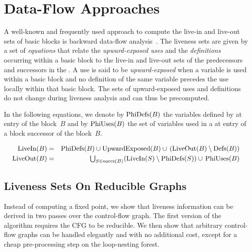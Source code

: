 \section{Data-Flow Approaches}
\label{sec:data-flow}

A well-known and frequently used approach to compute the live-in and live-out sets of basic blocks is backward data-flow analysis~\cite{appel:2002:modern}.
The liveness sets are given by a set of \emph{equations} that relate the \emph{upward-exposed uses} and the \emph{definitions} occurring within a basic block to the live-in and live-out sets of the predecessors and successors in the \@CFG.
A use is said to be \emph{upward-exposed} when a variable is used within a basic block and no definition of the same variable precedes the use locally within that basic block.
The sets of upward-exposed uses and definitions do not change during liveness analysis and can thus be precomputed.

In the following equations, we denote by $\textrm{PhiDefs}(B)$ the variables defined by \phifuns at entry of the block~$B$ and by $\textrm{PhiUses}(B)$ the set of variables used in a \phifun at entry of a block successor of the block~$B$.

\begin{eqnarray*}
	\textrm{LiveIn}(B) & = & \textrm{PhiDefs}(B) \cup \textrm{UpwardExposed}(B) \cup \,(\textrm{LiveOut}(B)\setminus \textrm{Defs}(B)) \\
	\textrm{LiveOut}(B)& = &
	\textstyle \bigcup_{S \in \textrm{succs}(B)} (\textrm{LiveIn}(S) \setminus
	\textrm{PhiDefs}(S)) \cup\, \textrm{PhiUses}(B)
\end{eqnarray*}

\subsection{Liveness Sets On Reducible Graphs}
\label{sec:forreducible}

Instead of computing a fixed point, we show that liveness information can be derived in two passes over the control-flow graph.
The first version of the algorithm requires the CFG to be reducible.
We then show that arbitrary control-flow graphs can be handled elegantly and with no additional cost, except for a cheap pre-processing step on the loop-nesting forest.

